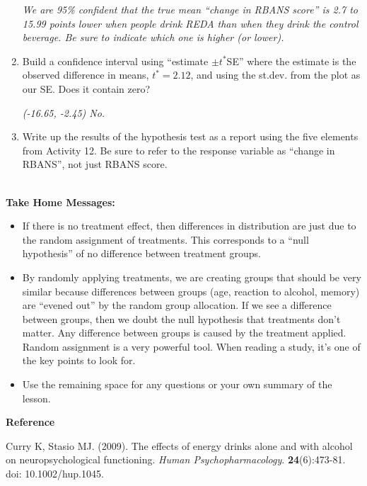 \begin{enumerate}
\begin{key}
  {\it  We are 95\% confident that the true mean ``change in RBANS score''
  is  2.7 to 15.99 points lower when people drink REDA than when they
   drink the control beverage. Be sure to indicate which one is higher
 (or lower). } 
\end{key}
\item Build a confidence interval using ``estimate $\pm t^*$SE'' where the
  estimate is the observed difference in means, $t^* = 2.12$, and
  using the st.dev. from the plot as our SE.  Does it contain zero?
 \begin{students}
    \vspace{2cm}    
\end{students}

\begin{key}
  {\it (-16.65, -2.45)  No.}
\end{key}


\item Write up the results of the hypothesis test as a report using
  the five elements from Activity 12.  Be sure to refer to the response
  variable as ``change in RBANS'', not just RBANS score. \\ \ \\

\begin{students}
 \newpage 
\end{students}
 \end{enumerate}


{\sf\bf Take Home Messages:}
\begin{itemize}
  \item 
  If there is no treatment effect, then differences in distribution
  are just due to the random assignment of treatments.  This
  corresponds to a ``null hypothesis'' of no difference between
  treatment groups.
\item  By randomly applying treatments, we are creating groups that
  should be very similar because differences between groups (age,
  reaction to alcohol, memory) are “evened out” by the random group
  allocation. If we see a difference between groups, then we doubt the
  null hypothesis that treatments don't matter.  Any difference
  between groups is caused by the treatment applied.  Random
  assignment is a very powerful tool.  When reading a study, it's one
  of the key points to look for. 
 \item 
  Use the remaining space for any questions or your own summary of the
  lesson. \vfill

\end{itemize}
{\sf\bf Reference}

 Curry K, Stasio MJ.  (2009). The effects of energy drinks alone and with
 alcohol on neuropsychological functioning. {\it Human  Psychopharmacology}.
{\bf 24}(6):473-81. doi: 10.1002/hup.1045. 


